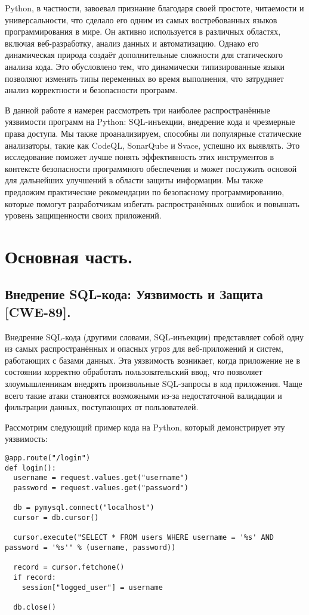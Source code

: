 \documentclass[a4paper,12pt]{article} %
\begin{document}
		\par Python, в частности, завоевал признание благодаря своей простоте, читаемости и универсальности, что сделало его одним из самых востребованных языков программирования в мире. Он активно используется в различных областях, включая веб-разработку, анализ данных и автоматизацию. Однако его динамическая природа создаёт дополнительные сложности для статического анализа кода. Это обусловлено тем, что динамически типизированные языки позволяют изменять типы переменных во время выполнения, что затрудняет анализ корректности и безопасности программ.

		\par В данной работе я намерен рассмотреть три наиболее распространённые уязвимости программ на Python: SQL-инъекции, внедрение кода и чрезмерные права доступа. Мы также проанализируем, способны ли популярные статические анализаторы, такие как CodeQL, SonarQube и Svace, успешно их выявлять. Это исследование поможет лучше понять эффективность этих инструментов в контексте безопасности программного обеспечения и может послужить основой для дальнейших улучшений в области защиты информации. Мы также предложим практические рекомендации по безопасному программированию, которые помогут разработчикам избегать распространённых ошибок и повышать уровень защищенности своих приложений.

	\section{Основная часть.}
		\subsection{Внедрение SQL-кода: Уязвимость и Защита [CWE-89].}
			Внедрение SQL-кода (другими словами, SQL-инъекции) представляет собой одну из самых распространённых и опасных угроз для веб-приложений и систем, работающих с базами данных. Эта уязвимость возникает, когда приложение не в состоянии корректно обработать пользовательский ввод, что позволяет злоумышленникам внедрять произвольные SQL-запросы в код приложения. Чаще всего такие атаки становятся возможными из-за недостаточной валидации и фильтрации данных, поступающих от пользователей.

			\par Рассмотрим следующий пример кода на Python, который демонстрирует эту уязвимость:

			\begin{lstlisting}[style=pythonstyle]
@app.route("/login")
def login():
  username = request.values.get("username")
  password = request.values.get("password")

  db = pymysql.connect("localhost")
  cursor = db.cursor()

  cursor.execute("SELECT * FROM users WHERE username = '%s' AND password = '%s'" % (username, password))

  record = cursor.fetchone()
  if record:
    session["logged_user"] = username

  db.close()
			\end{lstlisting}
\end{document}
